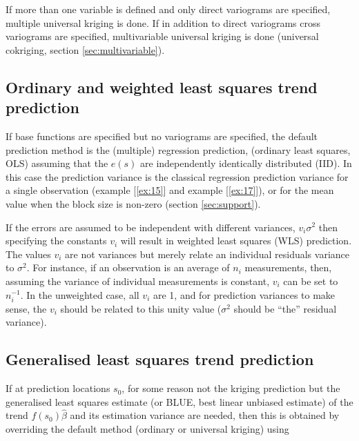 \documentclass[a4paper,12pt]{book}
\renewcommand{\cite}{\citet}
\newcommand{\ex}[1]{example [\ref{ex:#1}]}
\newcommand{\ex}[1]{example [\ref{ex:#1}]}
\begin{document}
If more than one variable is defined and only direct variograms are
specified, multiple universal kriging is done. If in addition to direct
variograms cross variograms are specified, multivariable universal
kriging is done \cite{verhoef93} (universal cokriging, section
\ref{sec:multivariable}).

\subsection*{Ordinary and weighted least squares trend prediction}

If base functions are specified but no variograms are specified, the
default prediction method is the (multiple) regression prediction,
(ordinary least squares, OLS) assuming that the $e(s)$ are independently
identically distributed (IID). In this case the prediction variance is
the classical regression prediction variance for a single observation
(\ex{15} and \ex{17}), or for the mean value when the block size is
non-zero (section \ref{sec:support}).

If the errors are assumed to be independent with different variances,
$v_i \sigma^2$ then specifying the constants $v_i$ will result in weighted
least squares (WLS) prediction. The values $v_i$ are not variances
but merely relate an individual residuals variance to $\sigma^2$. For
instance, if an observation is an average of $n_i$ measurements, then,
assuming the variance of individual measurements is constant, $v_i$ can
be set to $n^{-1}_i$. In the unweighted case, all $v_i$ are 1, and for
prediction variances to make sense, the $v_i$ should be related to this
unity value ($\sigma^2$ should be ``the'' residual variance).

\subsection*{Generalised least squares trend prediction}

If at prediction locations $s_0$, for some reason not the kriging
prediction but the generalised least squares estimate (or BLUE, best
linear unbiased estimate) of the trend $f(s_0 ) \hat \beta$ and its
estimation variance are needed, then this is obtained by overriding the
default method (ordinary or universal kriging) using
\end{document}
